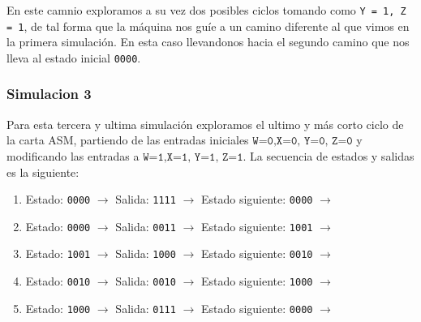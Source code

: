 \documentclass[12pt, letterpaper]{article}
\begin{document}
En este camnio exploramos a su vez dos posibles ciclos tomando como \texttt{Y = 1, Z = 1}, de tal forma que la máquina nos guíe a un camino diferente al que vimos en la primera simulación. En esta caso llevandonos hacia el segundo camino que nos lleva al estado inicial \texttt{0000}.

\subsubsection*{Simulacion 3}

Para esta tercera y ultima simulación exploramos el ultimo y más corto ciclo de la carta ASM, partiendo de las entradas iniciales \(\texttt{W=0,X=0, Y=0, Z=0}\) y modificando las entradas a \(\texttt{W=1,X=1, Y=1, Z=1}\). La secuencia de estados y salidas es la siguiente:

\begin{enumerate}
    \item[\textcolor{red}{sec-1:}] Estado: \texttt{0000} \(\rightarrow\) Salida: \texttt{1111} \(\rightarrow\) Estado siguiente: \texttt{0000} \(\rightarrow\)
    \item[\textcolor{red}{sec-2:}] Estado: \texttt{0000} \(\rightarrow\) Salida: \texttt{0011} \(\rightarrow\) Estado siguiente: \texttt{1001} \(\rightarrow\)
    \item[\textcolor{red}{sec-3:}] Estado: \texttt{1001} \(\rightarrow\) Salida: \texttt{1000} \(\rightarrow\) Estado siguiente: \texttt{0010} \(\rightarrow\)
    \item[\textcolor{red}{sec-4:}] Estado: \texttt{0010} \(\rightarrow\) Salida: \texttt{0010} \(\rightarrow\) Estado siguiente: \texttt{1000} \(\rightarrow\)
    \item[\textcolor{red}{sec-5:}] Estado: \texttt{1000} \(\rightarrow\) Salida: \texttt{0111} \(\rightarrow\) Estado siguiente: \texttt{0000} \(\rightarrow\)
\end{enumerate}
\end{document}
